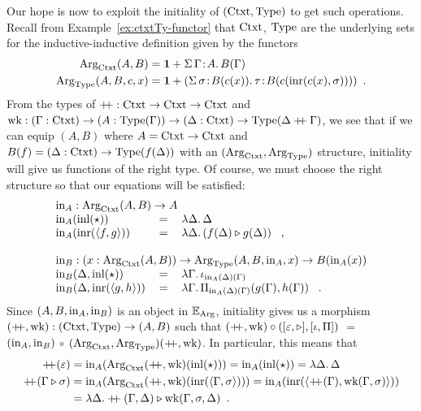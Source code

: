 \documentclass[orivec,envcountsame, ,envcountsect]{llncs}
\begin{document}
Our hope is now to exploit the initiality of $(\text{Ctxt}, \text{Type})$ to get
such operations. Recall from Example~\ref{ex:ctxtTy-functor} that
$\text{Ctxt}$, $\text{Type}$ are the underlying sets for the inductive-inductive
definition given by the functors
\begin{align*}
  \text{Arg}_{\text{Ctxt}}(A, B) &= \mathbf{1} + \Sigma\, \Gamma\!:\!A .\, B(\Gamma)\\
  \text{Arg}_{\text{Type}}(A, B, c, x) &= \mathbf{1} + (\Sigma\,  \sigma\!:\! B(c(x)).\, \tau\!:\!B(c(\text{inr}(c(x), \sigma))) ) \enspace .
\end{align*} 
From the types of $\mathbin{+\mkern-6mu+} : \text{Ctxt} \to \text{Ctxt} \to \text{Ctxt}$ and $\text{wk} :
(\Gamma : \text{Ctxt}) \to (A : \text{Type}(\Gamma)) \to (\Delta : \text{Ctxt}) \to
\text{Type}(\Delta \mathbin{+\mkern-6mu+} \Gamma)$, we see that if we can equip $(A,
B)$ where $A = \text{Ctxt} \to \text{Ctxt}$ and $B(f) = (\Delta : \text{Ctxt}) \to
\text{Type}(f(\Delta))$ with an $(\text{Arg}_{\text{Ctxt}}, \text{Arg}_{\text{Type}})$ structure, initiality
will give us functions of the right type. Of course, we must choose
the right structure so that our equations will be satisfied:
\[
\begin{tabular}{lcl}
  \multicolumn{3}{l}{$\inn_A : \ArgCtxt(A, B) \to A$} \\
  $\inn_A(\inl(\oneelt))$ &$=$& $\lambda \Delta .\, \Delta$ \\
  $\inn_A(\inr(\langle f , g\rangle))$ &$=$& $\lambda \Delta .\, (\consCtxt{f(\Delta)}{g(\Delta)})$ \enspace ,\\
\\
  \multicolumn{3}{l}{$\inn_B : (x : \ArgCtxt(A, B)) \to \ArgType(A, B, \inn_A, x) \to B(\inn_A(x))$} \\
  $\inn_B(\Delta, \inl(\oneelt))$ &$=$& $\lambda \Gamma .\, \baseTy{\inn_A(\Delta)(\Gamma)}$ \\
  $\inn_B(\Delta, \inr(\langle g , h\rangle))$ &$=$& $\lambda \Gamma .\, \piTy{\inn_A(\Delta)(\Gamma)}{g(\Gamma)}{h(\Gamma)}$ \enspace .
\end{tabular}
\]
Since $(A, B, \text{in}_A, \text{in}_B)$ is an object in
$\mathbb{E}_{\text{Arg}}$, initiality gives us a morphism \\ %
$(\mathbin{+\mkern-6mu+}, \text{wk}) : (\text{Ctxt}, \text{Type}) \to (A, B)$ such that
$(\mathbin{+\mkern-6mu+}, \text{wk}) \circ ([\varepsilon, \triangleright],
[\iota, \Pi])$ $=$ \\ $(\text{in}_A, \text{in}_B)$ $\circ$
$(\text{Arg}_{\text{Ctxt}}, \text{Arg}_{\text{Type}})(\mathbin{+\mkern-6mu+}, \text{wk})$.  In particular, this means that
\begin{align*}
\concatCtxt(\emptyCtxt) 
 &= \inn_A(\ArgCtxt(\concatCtxt, \wk)(\inl(\oneelt)))
  = \inn_A(\inl(\oneelt))
  = \lambda \Delta.\, \Delta \\
\concatCtxt(\consCtxt{\Gamma}{\sigma})
 &= \inn_A(\ArgCtxt(\concatCtxt, \wk)(\inr(\langle\Gamma, \sigma\rangle)))
  = \inn_A(\inr(\langle \concatCtxt(\Gamma), \wk(\Gamma, \sigma)\rangle)) \\
  &= \lambda \Delta . \consCtxt{\concatCtxt(\Gamma, \Delta)}{\wk(\Gamma, \sigma, \Delta)} \enspace .
\end{align*}
\end{document}
